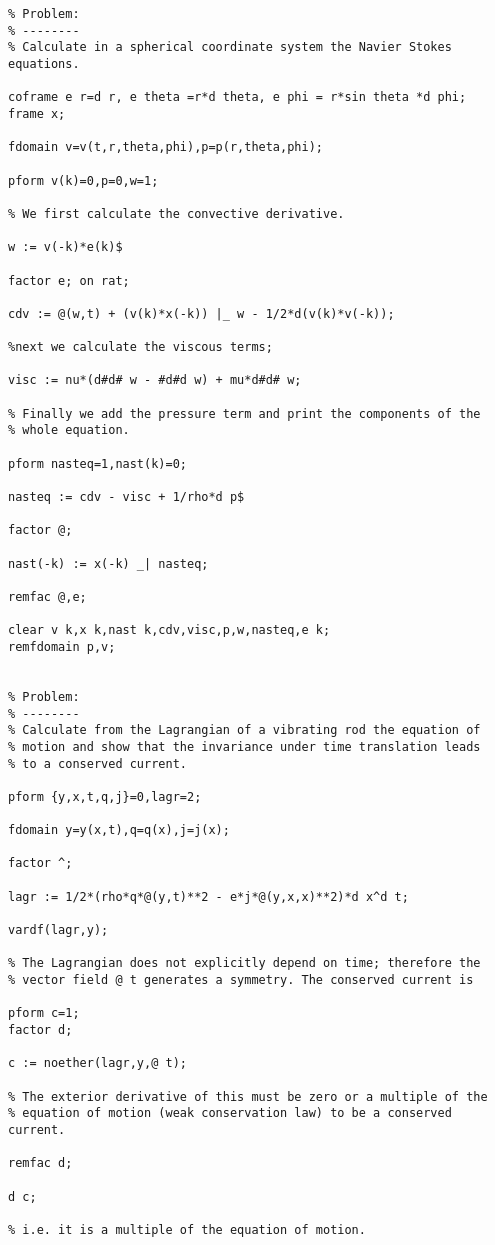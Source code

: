 {\begin{verbatim}
% Problem:
% --------
% Calculate in a spherical coordinate system the Navier Stokes equations.

coframe e r=d r, e theta =r*d theta, e phi = r*sin theta *d phi;
frame x;

fdomain v=v(t,r,theta,phi),p=p(r,theta,phi);

pform v(k)=0,p=0,w=1;

% We first calculate the convective derivative.

w := v(-k)*e(k)$

factor e; on rat;

cdv := @(w,t) + (v(k)*x(-k)) |_ w - 1/2*d(v(k)*v(-k));

%next we calculate the viscous terms;

visc := nu*(d#d# w - #d#d w) + mu*d#d# w;

% Finally we add the pressure term and print the components of the
% whole equation.

pform nasteq=1,nast(k)=0;

nasteq := cdv - visc + 1/rho*d p$

factor @;

nast(-k) := x(-k) _| nasteq;

remfac @,e;

clear v k,x k,nast k,cdv,visc,p,w,nasteq,e k;
remfdomain p,v;


% Problem:
% --------
% Calculate from the Lagrangian of a vibrating rod the equation of
% motion and show that the invariance under time translation leads
% to a conserved current.

pform {y,x,t,q,j}=0,lagr=2;

fdomain y=y(x,t),q=q(x),j=j(x);

factor ^;

lagr := 1/2*(rho*q*@(y,t)**2 - e*j*@(y,x,x)**2)*d x^d t;

vardf(lagr,y);

% The Lagrangian does not explicitly depend on time; therefore the
% vector field @ t generates a symmetry. The conserved current is

pform c=1;
factor d;

c := noether(lagr,y,@ t);

% The exterior derivative of this must be zero or a multiple of the
% equation of motion (weak conservation law) to be a conserved current.

remfac d;

d c;

% i.e. it is a multiple of the equation of motion.


\end{verbatim}}
